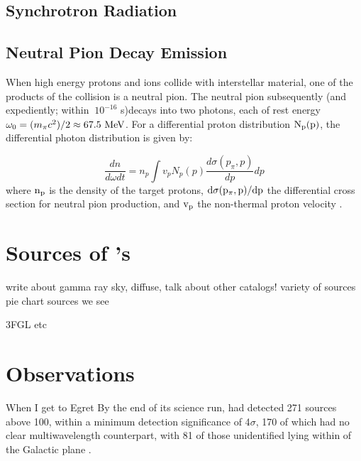 
\subsection{Synchrotron Radiation}\label{gamAstr:sync}

\subsection{Neutral Pion Decay Emission}\label{gamAstr:PP}
When high energy protons and ions collide with interstellar material, one of the products of the collision is a neutral pion. The neutral pion subsequently (and expediently; within $~10^{-16}$ s)decays into two \gam{} photons, each of rest energy $\omega_0 =(m_{\pi}c^2)/2\approx 67.5~\mathrm{MeV}{}$. For a differential proton distribution ${\rm N_p(p)}$, the differential photon distribution is given by:

\begin{equation}
\frac{d n}{d \omega d t} = 
n_p \int v_p N_p(p) 
\frac{d \sigma(p_\pi, p)}{d p}dp
\end{equation}
where ${\rm n_p}$ is the density of the target protons, ${\rm d \sigma(p_\pi, p)/dp}$ the differential cross section for neutral pion production, and ${\rm v_p}$ the non-thermal proton velocity \citep{Hillier84,Dermer86,Aharonian00}.

\section{Sources of \gam's}\label{gamAstr:Sources}
write about gamma ray sky, diffuse, talk about other catalogs! variety of sources pie chart sources we see

3FGL etc



\section{\gam{} Observations}\label{gamAstr:obs}

When I get to Egret
By the end of its science run, \egret{} had detected 271 sources above 100\mev{}, within a minimum detection significance of 4$\sigma$, 170 of which had no clear multiwavelength counterpart, with 81 of those unidentified lying within \blat of the Galactic plane \citep{Hartman99}.

